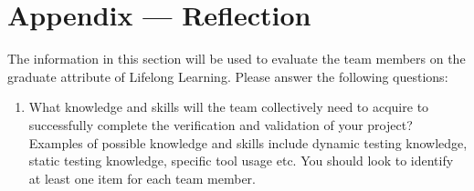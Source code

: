 \documentclass[12pt, titlepage]{article}
\begin{document}
\newpage{}
\section*{Appendix --- Reflection}

The information in this section will be used to evaluate the team members on the graduate attribute of Lifelong Learning. Please answer the following questions:
\begin{enumerate}[label=\arabic*., series=ar]
  \item What knowledge and skills will the team collectively need to acquire to
  successfully complete the verification and validation of your project?
  Examples of possible knowledge and skills include dynamic testing knowledge,
  static testing knowledge, specific tool usage etc. You should look to
  identify at least one item for each team member. \\
\end{enumerate}
\end{document}
